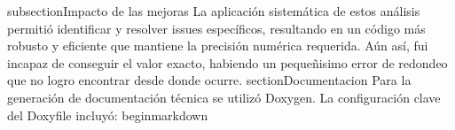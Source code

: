 {}\markdownRendererBackslash{}subsection\markdownRendererLeftBrace{}Impacto de las mejoras\markdownRendererRightBrace{}\markdownRendererInterblockSeparator
{}La aplicación sistemática de estos análisis permitió identificar y resolver issues específicos, resultando en un código más robusto y eficiente que mantiene la precisión numérica requerida. \markdownRendererBackslash{} Aún así, fui incapaz de conseguir el valor exacto, habiendo un pequeñisimo error de redondeo que no logro encontrar desde donde ocurre.\markdownRendererInterblockSeparator
{}\markdownRendererBackslash{}section\markdownRendererLeftBrace{}Documentacion\markdownRendererRightBrace{} Para la generación de documentación técnica se utilizó Doxygen. La configuración clave del Doxyfile incluyó: \markdownRendererBackslash{}begin\markdownRendererLeftBrace{}markdown\markdownRendererRightBrace{} \markdownRendererDocumentEnd